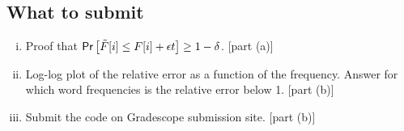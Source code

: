 \subsection*{What to submit}
\begin{enumerate}[(i)]
	\item Proof that $\mathsf{Pr}\left[\tilde{F}[i] \leq F[i] + \epsilon t\right] \geq 1-\delta$. [part (a)]
	\item Log-log plot of the relative error as a function of the frequency. Answer for which word frequencies is the relative error below 1. [part (b)]
	\item Submit the code on Gradescope submission site. [part (b)]
\end{enumerate}

